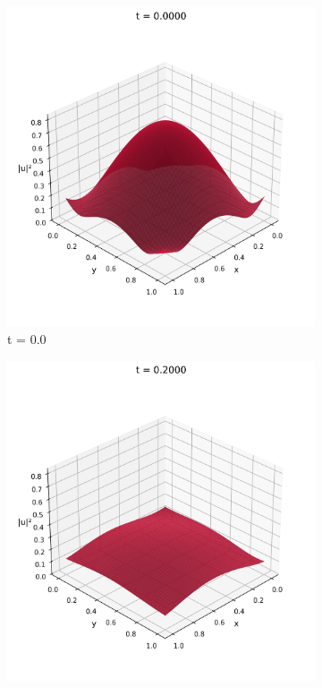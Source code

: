 \documentclass{article}
\theoremstyle{definition}
\theoremstyle{plain}
\theoremstyle{remark}
\begin{document}
\begin{figure}[h]
  \centering
  \begin{subfigure}[b]{0.3\textwidth}
    \centering
    \includegraphics[width=\textwidth, trim=0cm 0cm 0cm 1cm, clip]{figures/pinn_frame_0000.png}
    \caption{t = 0.0}
  \end{subfigure}
  \hfill
  \begin{subfigure}[b]{0.3\textwidth}
    \centering
    \includegraphics[width=\textwidth, trim=0cm 0cm 0cm 1cm, clip]{figures/pinn_frame_0010.png}

\end{subfigure}
\end{figure}
\end{document}
